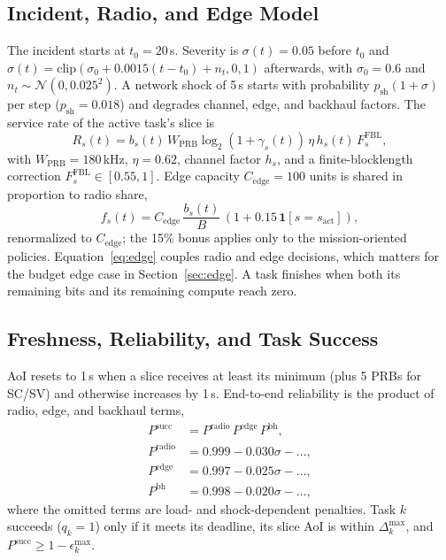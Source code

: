 \documentclass[conference]{IEEEtran}
\begin{document}
\subsection{Incident, Radio, and Edge Model}
The incident starts at $t_0=20$\,s. Severity is $\sigma(t)=0.05$ before $t_0$ and $\sigma(t)=\mathrm{clip}(\sigma_0+0.0015(t-t_0)+n_t,0,1)$ afterwards, with $\sigma_0=0.6$ and $n_t\sim\mathcal{N}(0,0.025^2)$. A network shock of 5\,s starts with probability $p_{\mathrm{sh}}(1+\sigma)$ per step ($p_{\mathrm{sh}}=0.018$) and degrades channel, edge, and backhaul factors. The service rate of the active task's slice is
\begin{equation}
R_s(t)=b_s(t)\,W_{\mathrm{PRB}}\log_2(1+\gamma_s(t))\,\eta\,h_s(t)\,F_s^{\mathrm{FBL}},
\label{eq:rate}
\end{equation}
with $W_{\mathrm{PRB}}=180$\,kHz, $\eta=0.62$, channel factor $h_s$, and a finite-blocklength correction $F_s^{\mathrm{FBL}}\in[0.55,1]$. Edge capacity $C_{\mathrm{edge}}=100$ units is shared in proportion to radio share,
\begin{equation}
f_s(t)=C_{\mathrm{edge}}\,\frac{b_s(t)}{B}\,(1+0.15\,\mathbf{1}[s=s_{\mathrm{act}}]),
\label{eq:edge}
\end{equation}
renormalized to $C_{\mathrm{edge}}$; the 15\% bonus applies only to the mission-oriented policies. Equation~\eqref{eq:edge} couples radio and edge decisions, which matters for the budget edge case in Section~\ref{sec:edge}. A task finishes when both its remaining bits and its remaining compute reach zero.

\subsection{Freshness, Reliability, and Task Success}
AoI resets to 1\,s when a slice receives at least its minimum (plus 5 PRBs for SC/SV) and otherwise increases by 1\,s. End-to-end reliability is the product of radio, edge, and backhaul terms,
\begin{equation}
\begin{aligned}
P^{\mathrm{succ}} &= P^{\mathrm{radio}}\,P^{\mathrm{edge}}\,P^{\mathrm{bh}},\\
P^{\mathrm{radio}} &= 0.999-0.030\sigma-\ldots,\\
P^{\mathrm{edge}} &= 0.997-0.025\sigma-\ldots,\\
P^{\mathrm{bh}} &= 0.998-0.020\sigma-\ldots,
\end{aligned}
\label{eq:rel}
\end{equation}
where the omitted terms are load- and shock-dependent penalties. Task $k$ succeeds ($q_k=1$) only if it meets its deadline, its slice AoI is within $\Delta_k^{\max}$, and $P^{\mathrm{succ}}\ge 1-\epsilon_k^{\max}$.
\end{document}
